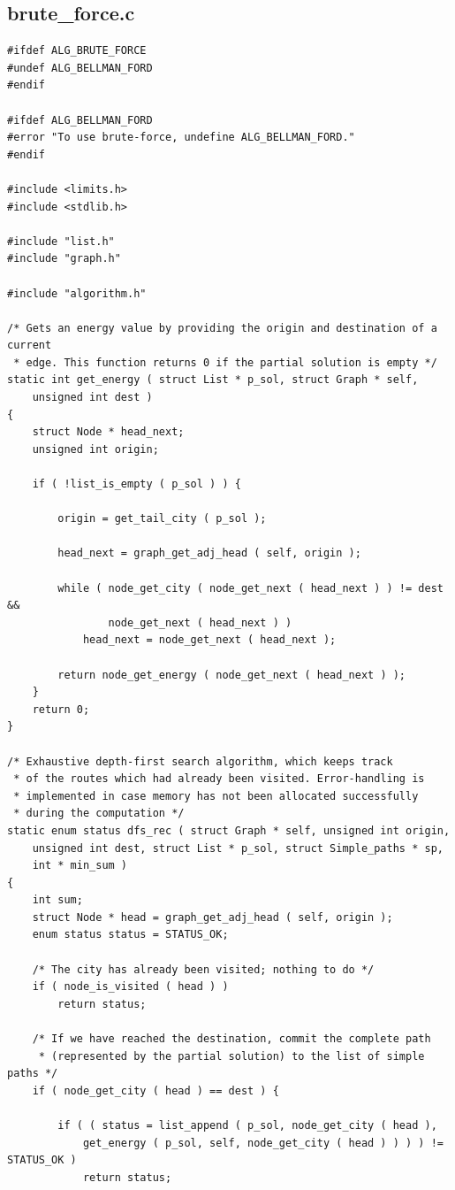\documentclass[11pt]{article}
\begin{document}
\subsection{brute\_force.c}
\begin{verbatim}
#ifdef ALG_BRUTE_FORCE
#undef ALG_BELLMAN_FORD
#endif

#ifdef ALG_BELLMAN_FORD
#error "To use brute-force, undefine ALG_BELLMAN_FORD."
#endif

#include <limits.h>
#include <stdlib.h>

#include "list.h"
#include "graph.h"

#include "algorithm.h"

/* Gets an energy value by providing the origin and destination of a current
 * edge. This function returns 0 if the partial solution is empty */
static int get_energy ( struct List * p_sol, struct Graph * self,
    unsigned int dest )
{
    struct Node * head_next;
    unsigned int origin;

    if ( !list_is_empty ( p_sol ) ) {

        origin = get_tail_city ( p_sol );

        head_next = graph_get_adj_head ( self, origin );

        while ( node_get_city ( node_get_next ( head_next ) ) != dest &&
                node_get_next ( head_next ) )
            head_next = node_get_next ( head_next );

        return node_get_energy ( node_get_next ( head_next ) );
    }
    return 0;
}

/* Exhaustive depth-first search algorithm, which keeps track
 * of the routes which had already been visited. Error-handling is
 * implemented in case memory has not been allocated successfully
 * during the computation */
static enum status dfs_rec ( struct Graph * self, unsigned int origin,
    unsigned int dest, struct List * p_sol, struct Simple_paths * sp,
    int * min_sum )
{
    int sum;
    struct Node * head = graph_get_adj_head ( self, origin );
    enum status status = STATUS_OK;

    /* The city has already been visited; nothing to do */
    if ( node_is_visited ( head ) )
        return status;

    /* If we have reached the destination, commit the complete path
     * (represented by the partial solution) to the list of simple paths */
    if ( node_get_city ( head ) == dest ) {

        if ( ( status = list_append ( p_sol, node_get_city ( head ),
            get_energy ( p_sol, self, node_get_city ( head ) ) ) ) != STATUS_OK )
            return status;


\end{verbatim}
\end{document}
